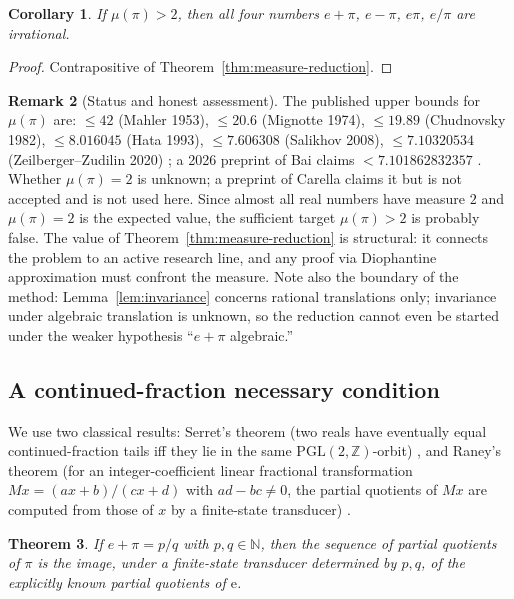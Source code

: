 \documentclass[11pt]{amsart}
\newtheorem{theorem}{Theorem}[section]
\newtheorem{corollary}[theorem]{Corollary}
\theoremstyle{definition}
\newtheorem{remark}[theorem]{Remark}
\theoremstyle{remark}
\numberwithin{equation}{section}
\newcommand{\Z}{\mathbb{Z}}
\newcommand{\N}{\mathbb{N}}
\newcommand{\irr}{\mu}
\newcommand{\ee}{\mathrm{e}}
\begin{document}
\begin{corollary}\label{cor:four-irrational}
If $\irr(\pi)>2$, then all four numbers $e+\pi$, $e-\pi$, $e\pi$, $e/\pi$ are irrational.
\end{corollary}

\begin{proof}
Contrapositive of Theorem~\ref{thm:measure-reduction}.
\end{proof}

\begin{remark}[Status and honest assessment]
The published upper bounds for $\irr(\pi)$ are: $\le42$ (Mahler 1953), $\le20.6$ (Mignotte 1974), $\le19.89$ (Chudnovsky 1982), $\le8.016045$ (Hata 1993), $\le7.606308$ (Salikhov 2008), $\le7.10320534$ (Zeilberger--Zudilin 2020) \cite{MathWorldMeasure,Alekseyev2011}; a 2026 preprint of Bai claims $<7.101862832357$ \cite{Bai2026}. Whether $\irr(\pi)=2$ is unknown; a preprint of Carella claims it \cite{CarellaMeasure} but is not accepted and is not used here. Since almost all real numbers have measure $2$ and $\irr(\pi)=2$ is the expected value, the sufficient target $\irr(\pi)>2$ is probably false. The value of Theorem~\ref{thm:measure-reduction} is structural: it connects the problem to an active research line, and any proof via Diophantine approximation must confront the measure. Note also the boundary of the method: Lemma~\ref{lem:invariance} concerns rational translations only; invariance under algebraic translation is unknown, so the reduction cannot even be started under the weaker hypothesis ``$e+\pi$ algebraic.''
\end{remark}

\subsection{A continued-fraction necessary condition}

We use two classical results: Serret's theorem (two reals have eventually equal continued-fraction tails iff they lie in the same $\mathrm{PGL}(2,\Z)$-orbit) \cite{Panti2017}, and Raney's theorem (for an integer-coefficient linear fractional transformation $Mx=(ax+b)/(cx+d)$ with $ad-bc\ne0$, the partial quotients of $Mx$ are computed from those of $x$ by a finite-state transducer) \cite{Raney1973}.

\begin{theorem}\label{thm:cf}
If $e+\pi=p/q$ with $p,q\in\N$, then the sequence of partial quotients of $\pi$ is the image, under a finite-state transducer determined by $p,q$, of the explicitly known partial quotients of $\ee$.
\end{theorem}
\end{document}
